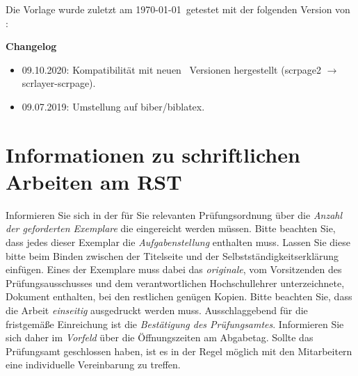 Die Vorlage wurde zuletzt am \today~getestet mit der folgenden Version von \KOMAScript: \KOMAScriptVersion 

\textbf{Changelog}
\begin{itemize}
	\item 09.10.2020: Kompatibilität mit neuen \KOMAScript~Versionen hergestellt (scrpage2 $\rightarrow$ scrlayer-scrpage).
	\item 09.07.2019: Umstellung auf biber/biblatex.
\end{itemize}

\section{Informationen zu schriftlichen Arbeiten am RST}
Informieren Sie sich in der für Sie relevanten Prüfungsordnung über die \emph{Anzahl der geforderten Exemplare} die eingereicht werden müssen. Bitte beachten Sie, dass jedes dieser Exemplar die \emph{Aufgabenstellung} enthalten muss. Lassen Sie diese bitte beim Binden zwischen der Titelseite und der Selbstständigkeitserklärung einfügen. Eines der Exemplare muss dabei das \emph{originale}, vom Vorsitzenden des Prüfungsausschusses und dem verantwortlichen Hochschullehrer unterzeichnete, Dokument enthalten, bei den restlichen genügen Kopien. Bitte beachten Sie, dass die Arbeit \emph{einseitig} ausgedruckt werden muss. Ausschlaggebend für die fristgemäße Einreichung ist die \emph{Bestätigung des Prüfungsamtes}. Informieren Sie sich daher im \emph{Vorfeld} über die Öffnungszeiten am Abgabetag. Sollte das Prüfungsamt geschlossen haben, ist es in der Regel möglich mit den Mitarbeitern eine individuelle Vereinbarung zu treffen.


